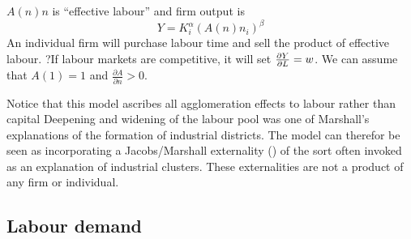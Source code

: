   $A(n)n$ is  ``effective labour'' and 
firm output is 
\begin{equation} 
Y=K_i^{\alpha }(A(n)n_i)^{\beta }
\label{eqn-solow-swan2}
\end{equation}
An individual firm will purchase labour time  and sell the product of effective labour. 
?If labour markets are competitive, it will set $\frac{\partial Y}{\partial L}=w$.
We can assume  that $A(1)=1$ and $\frac{\partial A}{\partial n}>0$. 

Notice that this model ascribes all agglomeration effects to labour rather than capital Deepening  and widening of the labour pool was one of Marshall's explanations of the formation of industrial districts. The model can therefor  be seen as incorporating a Jacobs/Marshall externality (\cite{beaudryWhoRightMarshall2009, vanderpanneAgglomerationExternalitiesMarshall2004}) of the sort often invoked as an explanation of industrial clusters. These externalities  are not a product of any firm or individual. 



\subsection{Labour demand}\label{sec-labour-demand}


